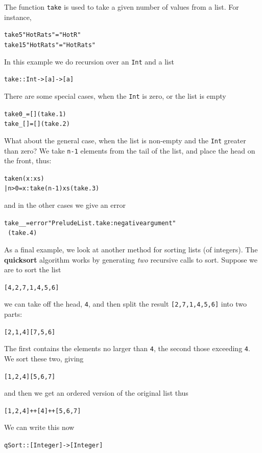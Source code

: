\begin{example}
The function \texttt{take} is used to take a given number of values from
a list. For instance, 
\begin{alltt}
take 5  "Hot Rats" = "Hot R"
take 15 "Hot Rats" = "Hot Rats" 
\end{alltt}
In this example we do recursion over an \texttt{Int} and a list
\begin{alltt}
take :: Int -> [a] -> [a]
\end{alltt}
There are some special cases, when the \texttt{Int} is zero, or the list
is empty
\begin{alltt}
take 0 _        = []\hfill(take.1)
take _ []       = []\hfill(take.2)
\end{alltt}
What about the general case, when the list is non-empty and the
\texttt{Int}
greater than zero? We take \texttt{n-1} elements from the tail of the
list, and place the head on the front, thus:
\begin{alltt}
take n (x:xs)
  | n>0         = x : take (n-1) xs\hfill(take.3)
\end{alltt}
and in the other cases we give an error
\begin{alltt}
take _ _        = error "PreludeList.take: negative argument"
\ \hfill(take.4)
\end{alltt}

 
As a final example, we look at another method for sorting lists (of
integers). The \textbf{quicksort} algorithm works by 
generating {\em two} recursive calls to sort. Suppose we are to sort the
list
\begin{alltt}
                        [4,2,7,1,4,5,6]
\end{alltt}
we can take off the head, \texttt{4}, and then split the result 
\texttt{[2,7,1,4,5,6]} into two parts: 
\begin{alltt}
                        [2,1,4]           [7,5,6]
\end{alltt}
The first contains the elements no larger than \texttt{4}, the
second those exceeding \texttt{4}. We sort these two, giving
\begin{alltt}
                        [1,2,4]           [5,6,7]
\end{alltt}
and then we get an ordered version of the original list thus
\begin{alltt}
                        [1,2,4] ++ [4] ++ [5,6,7]
\end{alltt}
We can write this now
\begin{alltt}
qSort :: [Integer] -> [Integer]


\end{alltt}
\end{example}
